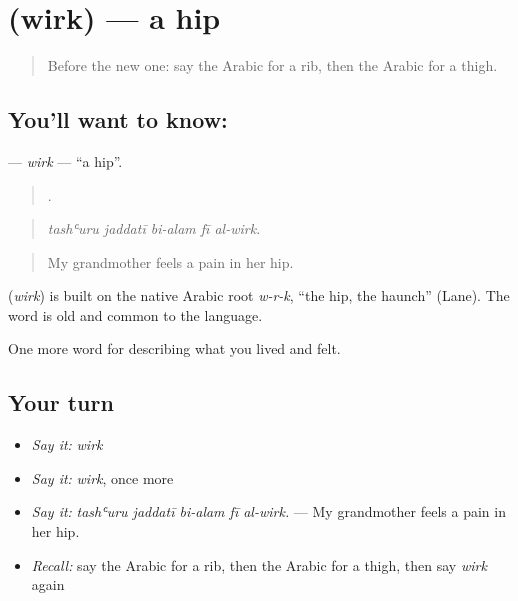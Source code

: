 \section[\texorpdfstring{\ar{ورك} (wirk)}{ورك (wirk)}]{ (wirk) — a hip}

\label{lesson:AR-C505-wirk}



\begin{quote}
Before the new one: say the Arabic for a rib, then the Arabic for a thigh.
\end{quote}

\subsection*{You'll want to know: }
\textbf{} — \emph{wirk} — \textquotedblleft{}a hip\textquotedblright{}.

\begin{quote}
    .
\end{quote}

\begin{quote}
\emph{tashʿuru jaddatī bi-alam fī al-wirk.}
\end{quote}

\begin{quote}
My grandmother feels a pain in her hip.
\end{quote}

\begin{cousinweb}
\textbf{} (\emph{wirk}) is built on the native Arabic root \emph{w-r-k}, \textquotedblleft{}the hip, the haunch\textquotedblright{} (Lane). The word is old and common to the language.
\end{cousinweb}

\begin{grammarlens}[title={What you've built}]
One more word for describing what you lived and felt.
\end{grammarlens}

\subsection*{Your turn}
\begin{itemize}
\raggedright
  \item \emph{Say it:} \emph{wirk}
  \item \emph{Say it:} \emph{wirk}, once more
  \item \emph{Say it:} \emph{tashʿuru jaddatī bi-alam fī al-wirk.} — My grandmother feels a pain in her hip.
  \item \emph{Recall:} say the Arabic for a rib, then the Arabic for a thigh, then say \emph{wirk} again
\end{itemize}


